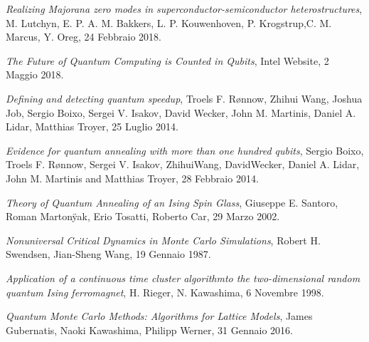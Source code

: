 \begin{thebibliography}{99}
    \textit{Realizing Majorana zero modes in superconductor-semiconductor heterostructures},
    M. Lutchyn, E. P. A. M. Bakkers, L. P. Kouwenhoven, P. Krogstrup,C. M. Marcus, Y. Oreg,
    24 Febbraio 2018.

    \textit{The Future of Quantum Computing is Counted in Qubits},
    Intel Website,
    2 Maggio 2018.

    \textit{Defining and detecting quantum speedup},
    Troels F. Rønnow, Zhihui Wang, Joshua Job, Sergio Boixo, Sergei V. Isakov, David Wecker, John M. Martinis, Daniel A. Lidar, Matthias Troyer,
    25 Luglio 2014.

    \textit{Evidence for quantum annealing with more than
one hundred qubits},
    Sergio Boixo, Troels F. Rønnow, Sergei V. Isakov, ZhihuiWang, DavidWecker, Daniel A. Lidar, John M. Martinis and Matthias Troyer,
    28 Febbraio 2014.

    \textit{Theory of Quantum Annealing of an Ising Spin Glass},
    Giuseppe E. Santoro, Roman Martonÿak, Erio Tosatti, Roberto Car,
    29 Marzo 2002.

    \textit{Nonuniversal Critical Dynamics in Monte Carlo Simulations},
    Robert H. Swendsen, Jian-Sheng Wang,
    19 Gennaio 1987.

    \textit{Application of a continuous time cluster algorithmto the two-dimensional random quantum Ising ferromagnet},
    H. Rieger, N. Kawashima,
    6 Novembre 1998.

    \textit{Quantum Monte Carlo Methods: Algorithms for Lattice Models},
    James Gubernatis, Naoki Kawashima, Philipp Werner,
    31 Gennaio 2016.

\end{thebibliography}
